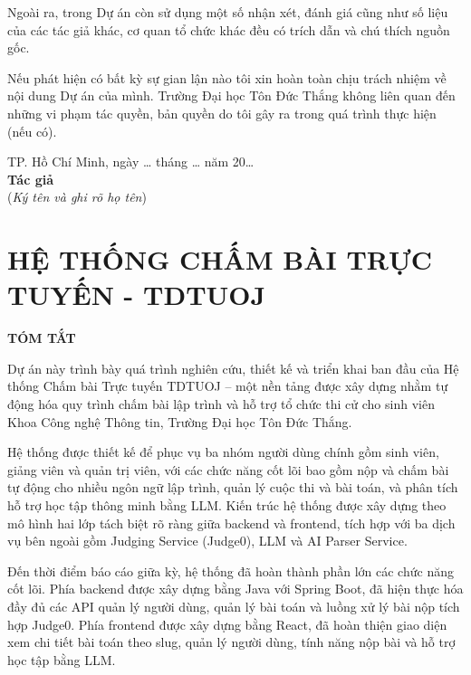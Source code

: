 \documentclass[12pt, a4paper]{report}
\newcommand{\thesistitle}{HỆ THỐNG CHẤM BÀI TRỰC TUYẾN - TDTUOJ}
\begin{document}
\noindent Ngoài ra, trong Dự án còn sử dụng một số nhận xét, đánh giá cũng như số liệu của các tác giả khác, cơ quan tổ chức khác đều có trích dẫn và chú thích nguồn gốc.

\noindent Nếu phát hiện có bất kỳ sự gian lận nào tôi xin hoàn toàn chịu trách nhiệm về nội dung Dự án của mình. Trường Đại học Tôn Đức Thắng không liên quan đến những vi phạm tác quyền, bản quyền do tôi gây ra trong quá trình thực hiện (nếu có).

\vspace{3cm}
\begin{flushright}
  \begin{minipage}{10cm}
    \centering
    TP. Hồ Chí Minh, ngày \ldots{} tháng \ldots{} năm 20\ldots{}\\[1cm]
    \textbf{Tác giả}\\[0.3cm]
    (\textit{Ký tên và ghi rõ họ tên})
  \end{minipage}
\end{flushright}
\newpage

\chapter*{\thesistitle}
\begin{center}\textbf{TÓM TẮT}\end{center}

\noindent Dự án này trình bày quá trình nghiên cứu, thiết kế và triển khai ban đầu của Hệ thống Chấm bài Trực tuyến TDTUOJ -- một nền tảng được xây dựng nhằm tự động hóa quy trình chấm bài lập trình và hỗ trợ tổ chức thi cử cho sinh viên Khoa Công nghệ Thông tin, Trường Đại học Tôn Đức Thắng.

\noindent Hệ thống được thiết kế để phục vụ ba nhóm người dùng chính gồm sinh viên, giảng viên và quản trị viên, với các chức năng cốt lõi bao gồm nộp và chấm bài tự động cho nhiều ngôn ngữ lập trình, quản lý cuộc thi và bài toán, và phân tích hỗ trợ học tập thông minh bằng \ac{LLM}. Kiến trúc hệ thống được xây dựng theo mô hình hai lớp tách biệt rõ ràng giữa backend và frontend, tích hợp với ba dịch vụ bên ngoài gồm Judging Service (Judge0), \ac{LLM} và AI Parser Service.

\noindent Đến thời điểm báo cáo giữa kỳ, hệ thống đã hoàn thành phần lớn các chức năng cốt lõi. Phía backend được xây dựng bằng Java với Spring Boot, đã hiện thực hóa đầy đủ các \ac{API} quản lý người dùng, quản lý bài toán và luồng xử lý bài nộp tích hợp Judge0. Phía frontend được xây dựng bằng React, đã hoàn thiện giao diện xem chi tiết bài toán theo slug, quản lý người dùng, tính năng nộp bài và hỗ trợ học tập bằng \ac{LLM}.
\end{document}
